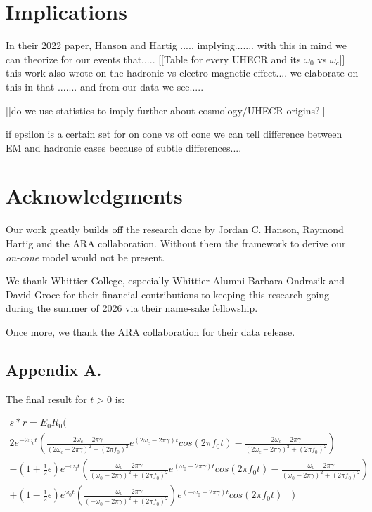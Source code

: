 \documentclass[amsmath,amssymb,aps,prd,10pt,twocolumn,showkeys]{revtex4}
\begin{document}
\section{Implications}
\label{sec:Imp}

In their 2022 paper, Hanson and Hartig ..... implying.......
with this in mind we can theorize for our events that.....
[[Table for every UHECR and its $\omega_0$ vs $\omega_c$]]
this work also wrote on the hadronic vs electro magnetic effect.... we elaborate on this in that ....... and from our data we see..... 

[[do we use statistics to imply further about cosmology/UHECR origins?]] 

if epsilon is a certain set for on cone vs off cone we can tell difference between EM and hadronic cases because of subtle differences.... 

\section{Acknowledgments}
\label{sec:Ack}
Our work greatly builds off the research done by Jordan C. Hanson, Raymond Hartig and the ARA collaboration. Without them the framework to derive our \textit{on-cone} model would not be present. 

We thank Whittier College, especially Whittier Alumni Barbara Ondrasik and David Groce for their financial contributions to keeping this research going during the summer of 2026 via their name-sake fellowship. 

Once more, we thank the ARA collaboration for their data release. 

\newpage

\subsection{Appendix A.}

The final result for $t>0$ is:

\begin{multline}
s * r = E_0R_0( \\ 2e^{-2\omega_ct}(\frac{2\omega_c-2\pi\gamma}{(2\omega_c-2\pi\gamma)^2+(2\pi f_0)^2}e^{(2\omega_c-2\pi\gamma)t}cos(2\pi f_0t)- \frac{2\omega_c-2\pi\gamma}{(2\omega_c-2\pi\gamma)^2+(2\pi f_0)^2}) \\
 -(1+\frac{1}{2}\epsilon)e^{-\omega_0t}(\frac{\omega_0-2\pi\gamma}{(\omega_0-2\pi\gamma)^2+(2\pi f_0)^2}e^{(\omega_0-2\pi\gamma)t}cos(2\pi f_0 t)- \frac{\omega_0-2\pi\gamma}{(\omega_0-2\pi\gamma)^2+(2\pi f_0)^2}) \\ + (1-\frac{1}{2}\epsilon)e^{\omega_0t}(\frac{-\omega_0-2\pi\gamma}{(-\omega_0-2\pi\gamma)^2+(2\pi f_0)^2})e^{(-\omega_0-2\pi\gamma)t}cos(2\pi f_0t) \ \ \ \ )
\end{multline}
\end{document}
